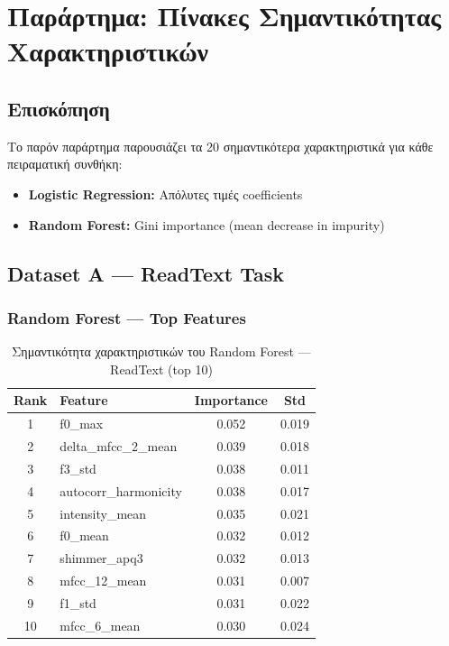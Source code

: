 
\chapter{Παράρτημα: Πίνακες Σημαντικότητας Χαρακτηριστικών}
\label{app:feature-importance}

\section{Επισκόπηση}

Το παρόν παράρτημα παρουσιάζει τα 20 σημαντικότερα χαρακτηριστικά για κάθε πειραματική συνθήκη:

\begin{itemize}
    \item \textbf{Logistic Regression:} Απόλυτες τιμές coefficients
    \item \textbf{Random Forest:} Gini importance (mean decrease in impurity)
\end{itemize}

\section{Dataset A --- ReadText Task}

\subsection{Random Forest --- Top Features}

\begin{table}[H]
\centering
\begin{tabular}{@{}clcc@{}}
\toprule
\textbf{Rank} & \textbf{Feature} & \textbf{Importance} & \textbf{Std} \\
\midrule
1 & f0\_max & 0.052 & 0.019 \\
2 & delta\_mfcc\_2\_mean & 0.039 & 0.018 \\
3 & f3\_std & 0.038 & 0.011 \\
4 & autocorr\_harmonicity & 0.038 & 0.017 \\
5 & intensity\_mean & 0.035 & 0.021 \\
6 & f0\_mean & 0.032 & 0.012 \\
7 & shimmer\_apq3 & 0.032 & 0.013 \\
8 & mfcc\_12\_mean & 0.031 & 0.007 \\
9 & f1\_std & 0.031 & 0.022 \\
10 & mfcc\_6\_mean & 0.030 & 0.024 \\
\bottomrule
\end{tabular}
\caption{Σημαντικότητα χαρακτηριστικών του Random Forest --- ReadText (top 10)}
\label{tab:rf-readtext-importance}
\end{table}

